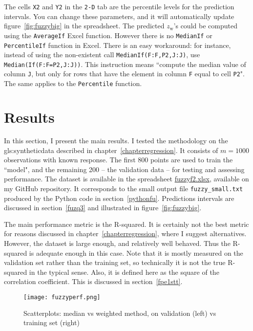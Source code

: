 \documentclass[oneside,10pt]{book}
\begin{document}
\noindent The cells \texttt{X2} and \texttt{Y2} in the \texttt{2-D} tab are the percentile levels for the prediction intervals. You can change these parameters, and it will automatically update figure~\ref{fig:fuzzybig} in the spreadsheet. The predicted $z_{\text{w}}$'s could be computed using the \texttt{AverageIf} Excel function. However there is no 
\texttt{MedianIf} or \texttt{PercentileIf} function in Excel.  There is an easy workaround: for instance, instead of using the non-existent 
call \texttt{MedianIf(F:F,P2,J:J)}, use \texttt{Median(If(F:F=P2,J:J))}. This instruction means ``compute the median value of column \texttt{J}, but only for rows that have the element in column \texttt{F} equal to cell \texttt{P2}". The same applies to the \texttt{Percentile} function.

\section{Results}

In this section, I present the main results. I tested the methodology on the \gls{gls:syntheticdata} described in chapter~\ref{chapterregression}. It consists of $m=1000$ observations with known response. The first 800 points are used to train the ``model", and the remaining 200 -- the validation data -- for testing and assessing performance. The dataset is available in the
spreadsheet \href{https://github.com/VincentGranville/Machine-Learning/blob/main/Spreadsheets/README.md}{fuzzyf2.xlsx}, available on my GitHub repository. It corresponds to the small output file \texttt{fuzzy\_small.txt} produced by the Python code in section~\ref{pythonfu}. Predictions intervals are discussed in section~\ref{fuzq3} and illustrated in figure~\ref{fig:fuzzybig}.

The main performance metric is the R-squared. It is certainly not the best metric for reasons discussed in chapter~\ref{chapterregression}, where I suggest alternatives. However, the dataset is large enough, and relatively well behaved. Thus the R-squared is adequate enough in this case. Note that it is mostly measured on the validation set rather than the training set, so technically it is not the true R-squared in the typical sense. Also, it is defined here as the square of the correlation coefficient. This is discussed in section~\ref{fpe1stt}.


\begin{figure}%
\centering
\texttt{[image: fuzzyperf.png]}
\caption{Scatterplots: median vs weighted method, on validation (left) vs training set (right)}
\label{fig:frfu}
\end{figure}
\end{document}
